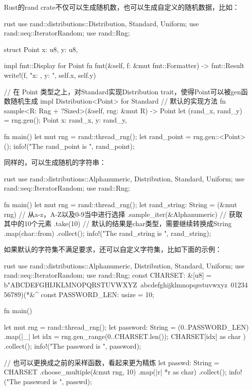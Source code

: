 Rust的rand crate不仅可以生成随机数，也可以生成自定义的随机数据，比如：
\begin{code-block}{rust}
use rand::distributions::{Distribution, Standard, Uniform};
use rand::seq::IteratorRandom;
use rand::Rng;

struct Point {
    x: u8,
    y: u8,
}

impl fmt::Display for Point {
    fn fmt(&self, f: &mut fmt::Formatter) -> fmt::Result {
        write!(f, "x: {}, y: {}", self.x, self.y)
    }
}

// 在 Point 类型之上，对Standard实现Distribution trait，使得Point可以被gen函数随机生成
impl Distribution<Point> for Standard {
    // 默认的实现方法
    fn sample<R: Rng + ?Sized>(&self, rng: &mut R) -> Point {
        let (rand_x, rand_y) = rng.gen();
        Point {
            x: rand_x,
            y: rand_y,
        }
    }
}

fn main() {
    let mut rng = rand::thread_rng();
    let rand_point = rng.gen::<Point>();
    info!("The rand_point is {}", rand_point);
}
\end{code-block}

同样的，可以生成随机的字符串：
\begin{code-block}{rust}
use rand::distributions::{Alphanumeric, Distribution, Standard, Uniform};
use rand::seq::IteratorRandom;
use rand::Rng;

fn main() {
    let mut rng = rand::thread_rng();
    let rand_string: String = (&mut rng)
        // 从a-z，A-Z以及0-9当中进行选择
        .sample_iter(&Alphanumeric)
        // 获取其中的10个元素
        .take(10)
        // 默认的结果是char类型，需要继续转换成String
        .map(char::from)
        .collect();
    info!("The rand_string is {}", rand_string);
}
\end{code-block}

如果默认的字符集不满足要求，还可以自定义字符集，比如下面的示例：
\begin{code-block}{rust}
use rand::distributions::{Alphanumeric, Distribution, Standard, Uniform};
use rand::seq::IteratorRandom;
use rand::Rng;
const CHARSET: &[u8] = b"ABCDEFGHIJKLMNOPQRSTUVWXYZ\
    abcdefghijklmnopqrstuvwxyz\
    0123456789)(*&^%
const PASSWORD_LEN: usize = 10;

fn main() {
    let mut rng = rand::thread_rng();
    let password: String = (0..PASSWORD_LEN)
        .map(|_| {
            let idx = rng.gen_range(0..CHARSET.len());
            CHARSET[idx] as char
        })
        .collect();
    info!("The password is {}", password);

    // 也可以更换成之前的采样函数，看起来更为精炼
    let passwd: String = CHARSET
        .choose_multiple(&mut rng, 10)
        .map(|r| *r as char)
        .collect();
    info!("The password is {}", passwd);
}
\end{code-block}

